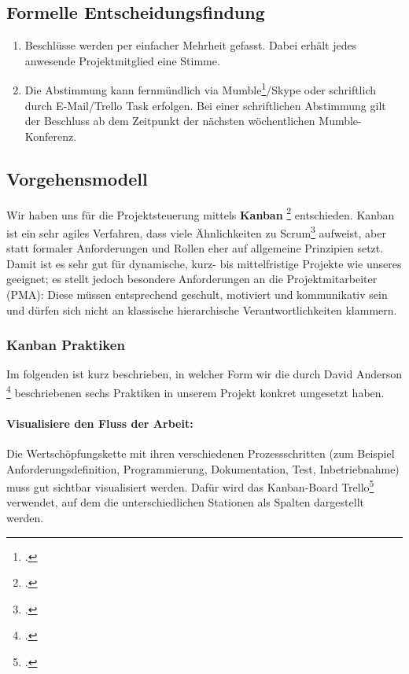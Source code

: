 \subsection{Formelle Entscheidungsfindung}
\begin{enumerate}
\item Beschlüsse werden per einfacher Mehrheit gefasst. Dabei erhält jedes anwesende Projektmitglied eine Stimme. 
\item Die Abstimmung kann fernmündlich via Mumble\footcite{mumble}/Skype oder schriftlich durch E-Mail/Trello Task erfolgen. Bei einer schriftlichen Abstimmung gilt der Beschluss ab dem Zeitpunkt der nächsten wöchentlichen Mumble-Konferenz.
\end{enumerate}

\subsection{Vorgehensmodell}
Wir haben uns für die Projektsteuerung mittels \textbf{Kanban} \footcite{wikiKanban} entschieden. Kanban ist ein sehr agiles Verfahren, dass viele Ähnlichkeiten zu Scrum\footcite{wikiScrum} aufweist, aber statt formaler Anforderungen und Rollen eher auf allgemeine Prinzipien setzt. Damit ist es sehr gut für dynamische, kurz- bis mittelfristige Projekte wie unseres geeignet; es stellt jedoch besondere Anforderungen an die Projektmitarbeiter (PMA): Diese müssen entsprechend geschult, motiviert und kommunikativ sein und dürfen sich nicht an klassische hierarchische Verantwortlichkeiten klammern.

\subsubsection{Kanban Praktiken}
Im folgenden ist kurz beschrieben, in welcher Form wir die durch David Anderson \footcite{anderson2011kanban} beschriebenen sechs Praktiken in unserem Projekt konkret umgesetzt haben.

\paragraph{Visualisiere den Fluss der Arbeit:}Die Wertschöpfungskette mit ihren verschiedenen Prozessschritten (zum Beispiel Anforderungsdefinition, Programmierung, Dokumentation, Test, Inbetriebnahme) muss gut sichtbar visualisiert werden. Dafür wird das Kanban-Board Trello\footcite{trelloboard} verwendet, auf dem die unterschiedlichen Stationen als Spalten dargestellt werden. 

